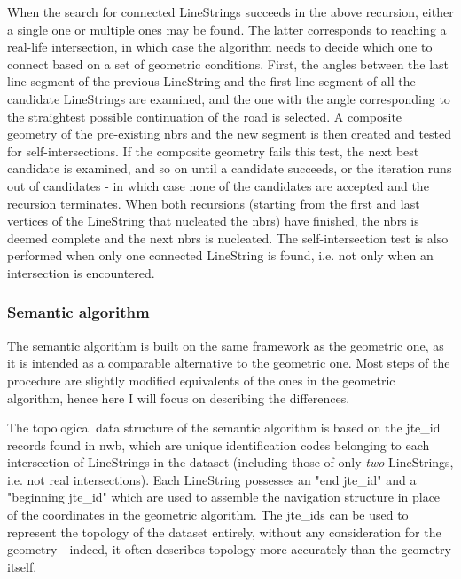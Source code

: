 When the search for connected LineStrings succeeds in the above recursion, either a single one or multiple ones may be found. The latter corresponds to reaching a real-life intersection, in which case the algorithm needs to decide which one to connect based on a set of geometric conditions. First, the angles between the last line segment of the previous LineString and the first line segment of all the candidate LineStrings are examined, and the one with the angle corresponding to the straightest possible continuation of the road is selected. A composite geometry of the pre-existing \ac{nbrs} and the new segment is then created and tested for self-intersections. If the composite geometry fails this test, the next best candidate is examined, and so on until a candidate succeeds, or the iteration runs out of candidates - in which case none of the candidates are accepted and the recursion terminates. When both recursions (starting from the first and last vertices of the LineString that nucleated the \ac{nbrs}) have finished, the \ac{nbrs} is deemed complete and the next \ac{nbrs} is nucleated. The self-intersection test is also performed when only one connected LineString is found, i.e. not only when an intersection is encountered.

\subsubsection{Semantic algorithm}

The semantic algorithm is built on the same framework as the geometric one, as it is intended as a comparable alternative to the geometric one. Most steps of the procedure are slightly modified equivalents of the ones in the geometric algorithm, hence here I will focus on describing the differences.

The topological data structure of the semantic algorithm is based on the \ac{jte_id} records found in \ac{nwb}, which are unique identification codes belonging to each intersection of LineStrings in the dataset (including those of only \textit{two} LineStrings, i.e. not real intersections). Each LineString possesses an "end \ac{jte_id}" and a "beginning \ac{jte_id}" which are used to assemble the navigation structure in place of the coordinates in the geometric algorithm. The \ac{jte_id}s can be used to represent the topology of the dataset entirely, without any consideration for the geometry - indeed, it often describes topology more accurately than the geometry itself.


